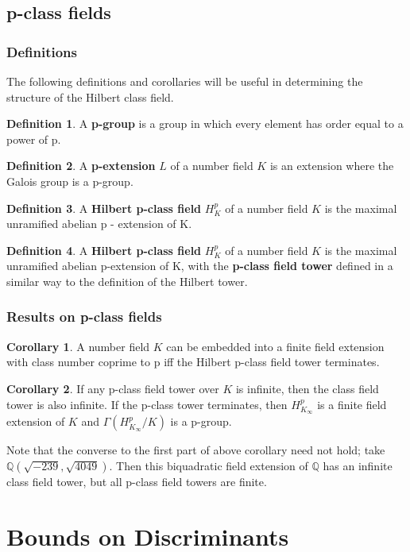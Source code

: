 \documentclass[12pt]{extarticle}
\newcommand{\<}{\langle}
\renewcommand{\>}{\rangle}
\theoremstyle{definition}
\newtheorem{corollary}{Corollary}
\newtheorem*{definition}{Definition}
\begin{document}
\subsection{p-class fields}
\subsubsection*{Definitions}
The following definitions and corollaries will be useful in determining the structure of the Hilbert class field. 
\begin{definition}
A \textbf{p-group} is a group in which every element has order equal to a power of p.
\end{definition}
\begin{definition}
A \textbf{p-extension} $L$ of a number field $K$ is an extension where the Galois group is a p-group.
\end{definition}
\begin{definition}
A \textbf{Hilbert p-class field} $H_K^{p}$ of a number field $K$ is the maximal unramified abelian p - extension of K.
\end{definition}
\begin{definition}
A \textbf{Hilbert p-class field} $H_K^{p}$ of a number field $K$ is the maximal unramified abelian p-extension of K, with the \textbf{p-class field tower} defined in a similar way to the definition of the Hilbert tower. 
\end{definition}

\subsubsection{Results on p-class fields }
\begin{corollary}
 A number field $K$ can be embedded into a finite field extension with class number coprime to p iff the Hilbert p-class field tower terminates.
\end{corollary}
\begin{corollary}
If any p-class field tower over $K$ is infinite, then the class field tower is also infinite. If the p-class tower terminates, then $H_{K_\infty}^{p}$ is a finite field extension of $K$ and $\Gamma(H_{K_\infty}^{p}/K)$ is a p-group.
\end{corollary}
Note that the converse to the first part of above corollary need not hold; take $\mathbb{Q}\left(\sqrt{-239},\sqrt{4049}\right)$. Then this biquadratic field extension of $\mathbb{Q}$ has an infinite class field tower, but all p-class field towers are finite.
\section{Bounds on Discriminants}
\end{document}
